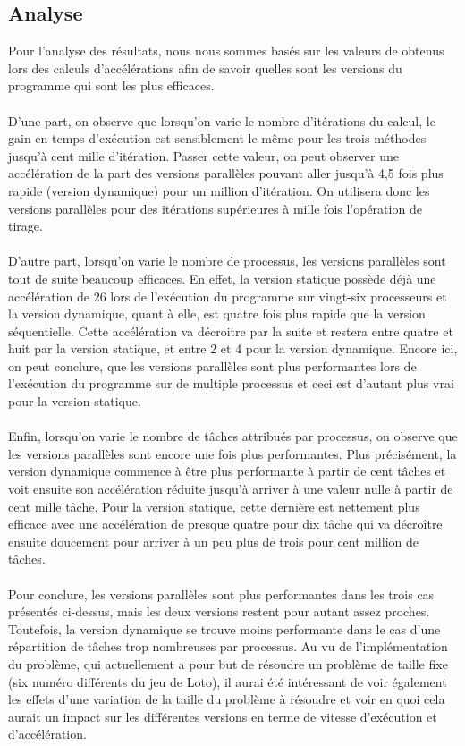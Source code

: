 \documentclass[a4paper,12pt]{article}
\begin{document}
\subsection{Analyse}
Pour l'analyse des résultats, nous nous sommes basés sur les valeurs de obtenus lors des calculs d'accélérations afin de savoir quelles sont les versions du programme qui sont les plus efficaces. 
\\\\
\indent D'une part, on observe que lorsqu'on varie le nombre d'itérations du calcul, le gain en temps d'exécution est sensiblement le même pour les trois méthodes jusqu'à cent mille d'itération. Passer cette valeur, on peut observer une accélération de la part des versions parallèles pouvant aller jusqu'à 4,5 fois plus rapide (version dynamique) pour un million d'itération. On utilisera donc les versions parallèles pour des itérations supérieures à mille fois l'opération de tirage. 
\\\\
\indent D'autre part, lorsqu'on varie le nombre de processus, les versions parallèles sont tout de suite beaucoup efficaces. En effet, la version statique possède déjà une accélération de 26 lors de l'exécution du programme sur vingt-six processeurs et la version dynamique, quant à elle, est quatre fois plus rapide que la version séquentielle. Cette accélération va décroitre par la suite et restera entre quatre et huit par la version statique, et entre 2 et 4 pour la version dynamique. Encore ici, on peut conclure, que les versions parallèles sont plus performantes lors de l'exécution du programme sur de multiple processus et ceci est d'autant plus vrai pour la version statique. 
\\\\
\indent Enfin, lorsqu'on varie le nombre de tâches attribués par processus, on observe que les versions parallèles sont encore une fois plus performantes. Plus précisément, la version dynamique commence à être plus performante à partir de cent tâches et voit ensuite son accélération réduite jusqu'à arriver à une valeur nulle à partir de cent mille tâche. Pour la version statique, cette dernière est nettement plus efficace avec une accélération de presque quatre pour dix tâche qui va décroître ensuite doucement pour arriver à un peu plus de trois pour cent million de tâches.
\\\\
\indent Pour conclure, les versions parallèles sont plus performantes dans les trois cas présentés ci-dessus, mais les deux versions restent pour autant assez proches. Toutefois, la version dynamique se trouve moins performante dans le cas d'une répartition de tâches trop nombreuses par processus. Au vu de l'implémentation du problème, qui actuellement a pour but de résoudre un problème de taille fixe (six numéro différents du jeu de Loto), il aurai été intéressant de voir également les effets d'une variation de la taille du problème à résoudre et voir en quoi cela aurait un impact sur les différentes versions en terme de vitesse d'exécution et d'accélération. 


\newpage

\nocite{*} %


\end{document}
